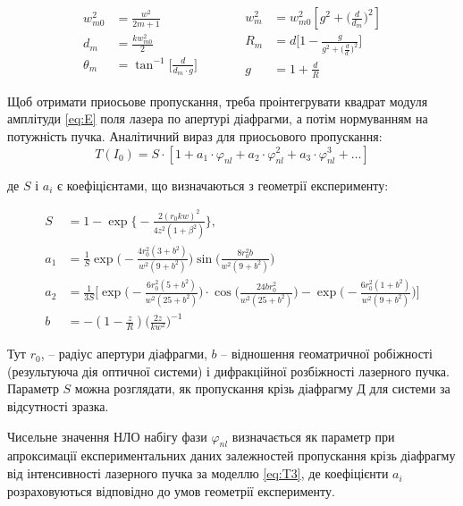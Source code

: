 \begin{equation}
\begin{split}
w_{m0}^2 &= \frac{w^2}{2 m +1}\\
d_m &= \frac{k w_{m0}^2}{2}\\
\theta_m &= \tan^{-1} \Big[\frac{d}{d_m \cdot \textit{g}}\Big]
\end{split}
\quad\quad\quad
\begin{split}
 w_m^2 &= w_{m0}^2 [\textit{g}^2 + \Big( \frac{d}{d_m}\Big)^2]\\
 R_m &= d \Big[1-\frac{\textit{g}}{\textit{g}^2 + \Big( \frac{d}{d_.}\Big)^2}\Big]\\
 \textit{g} &= 1 + \frac{d}{R}
\end{split}
\end{equation}

Щоб отримати приосьове пропускання, треба проінтегрувати квадрат модуля амплітуди \ref{eq:E} поля лазера по апертурі діафрагми, а потім нормуванням на потужність пучка. Аналітичний вираз для приосьового пропускання:
\begin{equation}\label{eq:T3}
T ( I_0 ) = S \cdot [1 + a_1 \cdot \varphi_{nl} + a_2 \cdot \varphi_{nl}^2 + a_3 \cdot \varphi_{nl}^3 + \dots] 
\end{equation}

де $S$ і $a_i$ є коефіцієнтами, що визначаються з геометрії експерименту:

\begin{equation}
\begin{split}
S &= 1 - \exp\Big\{ -\frac{ 2( r_0 k w)^2 }{4 z^2 (1 + \beta^2 )} \Big\},\\
a_1 &= \frac{1}{S} \exp{\Big( - \frac{4r_0^2(3+b^2)}{w^2(9+b^2)} \Big)}\sin{\Big(  \frac{8r_0^2 b}{w^2 (9+b^2)}\Big)}\\
a_2 &= \frac{1}{3S}\Big[ \exp{\Big( -\frac{6r_0^2(5+b^2)}{w^2(25+b^2)}\Big)} \cdot \cos{\Big( \frac{24br_0^2}{w^2 (25+b^2)}\Big)}    - \exp{\Big( - \frac{6r_0^2(1+b^2)}{w^2(9+b^2)}\Big)}   \Big]\\
b &= - (1-\frac{z}{R})\Big(\frac{2z}{kw^2}\Big)^{-1}
\end{split}
\end{equation}

Тут $r_0$, -- радіус апертури діафрагми, $b$ -- відношення геоматричної робіжності (результуюча дія оптичної системи) і дифракційної розбіжності лазерного пучка. Параметр $S$ можна розглядати, як пропускання крізь діафрагму Д для системи за відсутності зразка.

Чисельне значення НЛО набігу фази $\varphi_{nl}$ визначається як параметр при
апроксимації експериментальних даних залежностей пропускання крізь діафрагму
від інтенсивності лазерного пучка за моделлю \ref{eq:T3}, де коефіцієнти $a_i$
розраховуються відповідно до умов геометрії експерименту.



%
%
